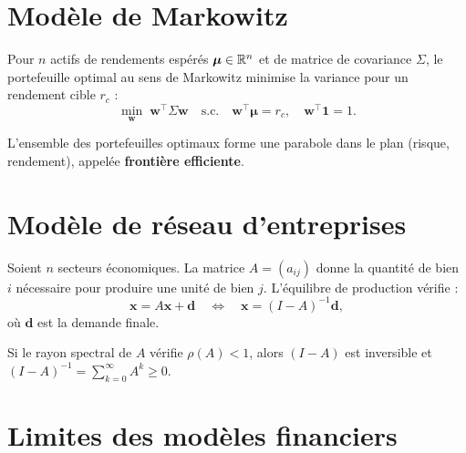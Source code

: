 \section{Mod\`ele de Markowitz}
\label{sec:markowitz}

\begin{definition}
Pour $n$ actifs de rendements esp\'er\'es $\boldsymbol{\mu}\in\mathbb{R}^n$
et de matrice de covariance $\Sigma$, le portefeuille optimal au
sens de Markowitz minimise la variance pour un rendement cible $r_c$ :
\[
  \min_{\mathbf{w}} \;\mathbf{w}^\top\Sigma\mathbf{w}
  \quad\text{s.c.}\quad
  \mathbf{w}^\top\boldsymbol{\mu}=r_c,\quad
  \mathbf{w}^\top\mathbf{1}=1.
\]
\end{definition}

\begin{proposition}
L'ensemble des portefeuilles optimaux forme une parabole dans le
plan (risque, rendement), appel\'ee \textbf{fronti\`ere efficiente}.
\end{proposition}

\section{Mod\`ele de r\'eseau d'entreprises}

\begin{definition}
Soient $n$ secteurs \'economiques. La matrice $A=(a_{ij})$ donne
la quantit\'e de bien $i$ n\'ecessaire pour produire une unit\'e
de bien $j$.  L'\'equilibre de production v\'erifie :
\[
  \mathbf{x} = A\mathbf{x} + \mathbf{d}
  \quad\Leftrightarrow\quad
  \mathbf{x} = (I-A)^{-1}\mathbf{d},
\]
o\`u $\mathbf{d}$ est la demande finale.
\end{definition}

\begin{proposition}
Si le rayon spectral de $A$ v\'erifie $\rho(A)<1$, alors $(I-A)$
est inversible et $(I-A)^{-1}=\sum_{k=0}^\infty A^k\geq 0$.
\end{proposition}

\section{Limites des mod\`eles financiers}

